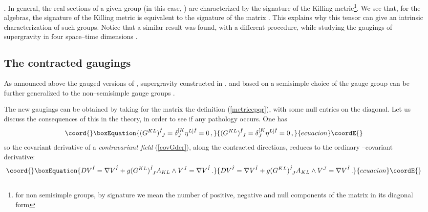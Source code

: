 \documentclass[a4paper,12pt]{article}
\begin{document}
\coordHE{}. In general, the real sections of a given
group (in this case, \coordHE{}) are characterized by the signature of
the Killing metric\footnote{for non semisimple groups, by
signature we mean the number of positive, negative and null
components of the matrix \myHighlight{$\eta$}\coordHE{} in its diagonal form}. We see
that, for the \coordHE{} algebras, the
signature of the Killing metric is equivalent to the signature of
the matrix \coordHE{}. This explains why this tensor can give an
intrinsic characterization of such groups. Notice that a similar
result was found, with a different procedure, while studying the
gaugings of \coordHE{} supergravity in four space--time
dimensions \cite{noi4D}.
\subsection{The contracted gaugings}
As announced above the gauged versions of \coordHE{}, \coordHE{}
supergravity constructed in \cite{gunwar}, \cite{PPV} and based on
a semisimple choice of the gauge group
\coordHE{} can be further
generalized to the non--semisimple gauge groups
\coordHE{}.
\par
The new gaugings can be obtained by taking for the matrix
\coordHE{} the definition (\ref{metriccpqr}), with some null
entries on the diagonal. Let us discuss the consequences of  this
in the theory, in order to see if any pathology occurs. One has
\begin{equation}\coord{}\boxEquation{
(G^{KL})^{\hat{I}}_{~J}=\delta^{[K}_J\eta^{L]\hat{I}}=0\,,
}{
(G^{KL})^{\hat{I}}_{~J}=\delta^{[K}_J\eta^{L]\hat{I}}=0\,,
}{ecuacion}\coordE{}\end{equation}
so the covariant derivative of a {\sl contravariant field}
(\ref{covGder}), along the contracted directions, reduces to the
ordinary  \coordHE{}--covariant derivative:
\begin{equation}\coord{}\boxEquation{
DV^{\hat{I}}= \nabla
V^{\hat{I}}+g(G^{KL})^{\hat{I}}_{~J}A_{KL}\wedge V^J =\nabla
V^{\hat{I}}\,.
}{
DV^{\hat{I}}= \nabla
V^{\hat{I}}+g(G^{KL})^{\hat{I}}_{~J}A_{KL}\wedge V^J =\nabla
V^{\hat{I}}\,.
}{ecuacion}\coordE{}\end{equation}
\end{document}
